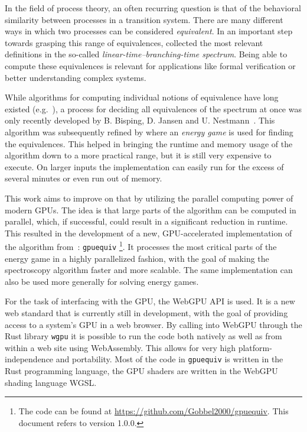 In the field of process theory,
an often recurring question is that of
the behavioral similarity between processes in a transition system.
There are many different ways in which two processes can be considered
\emph{equivalent}.
In an important step towards grasping this range of equivalences,
\textcite{glabbeek1990spectrum} collected the most relevant definitions in the
so-called \emph{linear-time--branching-time spectrum}.
Being able to compute these equivalences is relevant for applications like
formal verification or better understanding complex systems.

While algorithms for computing individual notions of equivalence
have long existed (e.g.~\cite{Blom2002}),
a process for deciding all equivalences of the spectrum at once
was only recently developed
by B. Bisping, D. Jansen and U. Nestmann~\cite{Bisping2022}.
This algorithm was subsequently refined by \textcite{bisping2023process}
where an \emph{energy game} is used for finding the equivalences.
This helped in bringing the runtime and memory usage of the algorithm down
to a more practical range,
but it is still very expensive to execute.
On larger inputs the implementation can easily run for the excess of several
minutes or even run out of memory.

This work aims to improve on that by utilizing the parallel computing power of
modern GPUs.
The idea is that large parts of the algorithm can be computed in parallel,
which, if successful, could result in a significant reduction in runtime.
This resulted in the development of a new,
GPU-accelerated implementation of the algorithm from~\cite{bisping2023process}:
\texttt{gpuequiv}%
\footnote{The code can be found at \url{https://github.com/Gobbel2000/gpuequiv}.
This document refers to version 1.0.0.}.
It processes the most critical parts of the energy game in a highly
parallelized fashion,
with the goal of making the spectroscopy algorithm faster and more scalable.
The same implementation can also be used more generally for solving energy
games.

For the task of interfacing with the GPU,
the WebGPU API is used.
It is a new web standard that is currently still in development,
with the goal of providing access to a system's GPU in a web browser.
By calling into WebGPU through the Rust library \texttt{wgpu} it is possible to
run the code both natively as well as from within a web site using WebAssembly.
This allows for very high platform-independence and portability.
Most of the code in \texttt{gpuequiv} is written in the
Rust programming language,
the GPU shaders are written in the WebGPU shading language WGSL\@.

